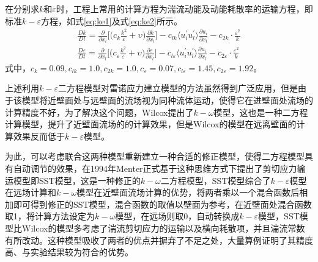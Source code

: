 在分别求$k$和$\varepsilon$时，工程上常用的计算方程为湍流动能及动能耗散率的运输方程\cite{cjr1989}，即标准$k-\varepsilon$方程，如式\eqref{eq:ke1}及式\eqref{eq:ke2}所示。
\begin{align}
\frac{Dk}{Dt}=\frac{\partial}{\partial x_l}\Big[\Big(c_k\frac{k^2}{\varepsilon}+\upsilon\Big)\frac{\partial k}{\partial x_l}\Big]-c_{lk} \big\langle u_i^{'}u_l^{'}\big\rangle\frac{\partial u_i}{\partial x_l}-c_{2k}\cdot\frac{\varepsilon^2}{k}
\label{eq:ke1}\\
\frac{D\varepsilon}{Dt}=\frac{\partial}{\partial x_l}\Big[\Big(c_\varepsilon\frac{k^2}{\varepsilon}+\upsilon\Big)\frac{\partial \varepsilon}{\partial x_l}\Big]-c_{l\varepsilon}\big\langle u_i^{'}u_l^{'}\big\rangle\frac{\partial u_i}{\partial x_l}-c_{2\varepsilon}\cdot\frac{\varepsilon^2}{k}
\label{eq:ke2}
\end{align}
式中，$c_k=0.09,c_{lk}=1.0,c_{2k}=1.0,c_\varepsilon=0.07,c_{l\varepsilon}=1.45,c_{2\varepsilon}=1.92$。

上述利用$k-\varepsilon$二方程模型对雷诺应力建立模型的方法虽然得到广泛应用，但是由于该模型将近壁面处与远壁面的流场视为同种流体运动，使得它在进壁面处流场的计算精度不好，为了解决这个问题，Wilcox提出了$k-\omega$模型，这也是一种二方程计算模型，提升了近壁面流场的的计算效果，但是Wilcox的模型在远离壁面的计算效果反而低于$k-\varepsilon$模型。

为此，可以考虑联合这两种模型重新建立一种合适的修正模型，使得二方程模型具有自动调节的效果，在1994年Menter正式基于这种思维方式下提出了剪切应力输运模型即SST模型，这是一种修正的$k-\omega$二方程模型，SST模型综合了$k-\varepsilon$模型在远场计算和$k-\omega$模型在近壁面流场计算的优势，将两者乘以一个混合函数后相加即可得到修正的SST模型，混合函数的取值以壁面为参考，在近壁面处混合函数取1，将计算方法设定为$k-\omega$模型，在远场则取0，自动转换成$k-\varepsilon$模型，SST模型比Wilcox的模型多考虑了湍流剪切应力的运输以及横向耗散项，并且湍流常数有所改动。这种模型吸收了两者的优点并摒弃了不足之处，大量算例证明了其精度高、与实验结果较为符合的优势。

